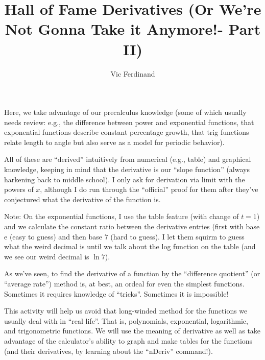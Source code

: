 \documentclass{ximera}
\author{Vic Ferdinand}
\title{Hall of Fame Derivatives (Or We're Not Gonna Take it Anymore!- Part II)}
\begin{document}
\begin{abstract}
\end{abstract}
\maketitle

\begin{instructorIntro}
Here, we take advantage of our precalculus knowledge (some of which usually needs review:  e.g., the difference between power and exponential functions, that exponential functions describe constant percentage growth, that trig functions relate length to angle but also serve as a model for periodic behavior).

All of these are ``derived'' intuitively from numerical (e.g., table) and graphical knowledge, keeping in mind that the derivative is our ``slope function'' (always harkening back to middle school).  I only ask for derivation via limit with the powers of $x$, although I do run through the ``official'' proof for them after they've conjectured what the derivative of the function is.

Note:  On the exponential functions, I use the table feature (with change of $t = 1$) and we calculate the constant ratio between the derivative entries (first with base e (easy to guess) and then base $7$ (hard to guess).  I let them squirm to guess what the weird decimal is until we talk about the log function on the table (and we see our weird decimal is $\ln 7$).

\end{instructorIntro}



As we've seen, to find the derivative of a function by the ``difference quotient'' (or ``average rate'') method is, at best, an ordeal for even the simplest functions.  Sometimes it requires knowledge of ``tricks''.  Sometimes it is impossible!

 This activity will help us avoid that long-winded method for the functions we usually deal with in ``real life''.  That is, polynomials, exponential, logarithmic, and trigonometric functions.  We will use the meaning of derivative as well as take advantage of the calculator's ability to graph and make tables for the functions (and their derivatives, by learning about the ``nDeriv'' command!).
     
\end{document}
